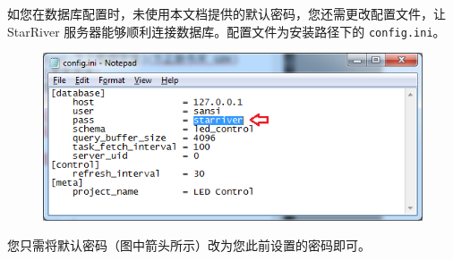 如您在数据库配置时，未使用本文档提供的默认密码，您还需更改配置文件，让
StarRiver 服务器能够顺利连接数据库。配置文件为安装路径下的
\texttt{config.ini}。

\begin{figure}[htbp]
\centering
\includegraphics{img/config.png}
\caption{}
\end{figure}

您只需将默认密码（图中箭头所示）改为您此前设置的密码即可。

